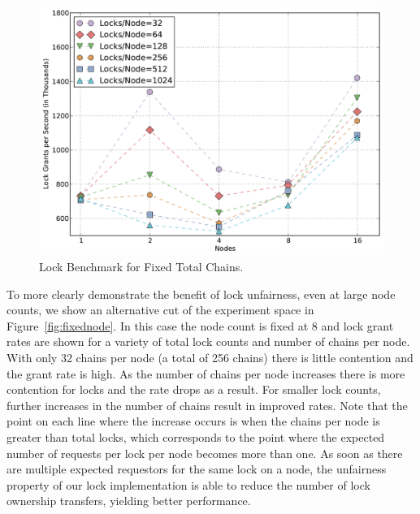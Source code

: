 
\begin{figure}
\begin{center}
\includegraphics[scale=0.33]{figs/fixed_lock_chains.pdf}
\end{center}
\vspace{-6mm}
\caption{Lock Benchmark for Fixed Total Chains.\label{fig:fixedlock}}
\vspace{-4mm}
\end{figure}

To more clearly demonstrate the benefit of lock unfairness, even at large node counts, we show an alternative
cut of the experiment space in Figure~\ref{fig:fixednode}.
In this case the node count is fixed at 8 and lock grant rates are shown for a variety of total lock counts
and number of chains per node.
With only 32 chains per node (a total of 256 chains)
there is little contention and the grant rate is high.  As the number of chains per node increases there is
more contention for locks and the rate drops as a result.  For smaller lock counts, further increases in
the number of chains result in improved rates.  Note that the point on each line where the increase occurs
is when the chains per node is greater than total locks, which corresponds to the point where the expected 
number of requests per lock 
per node becomes more than one.  As soon as there are multiple expected requestors for the same lock on
a node, the unfairness property of our lock implementation is able to reduce the number of lock ownership 
transfers, yielding better performance.

